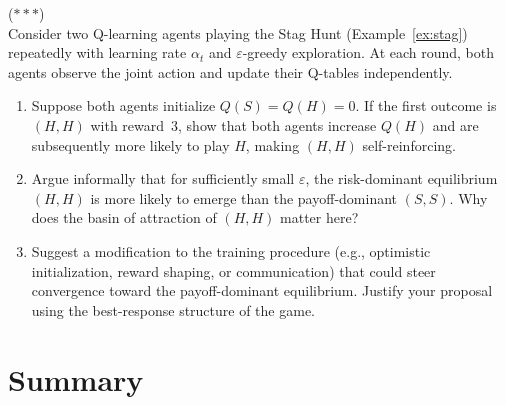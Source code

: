 \documentclass[11pt,a4paper]{article}
\begin{document}
\begin{exercise}
\label{ex:marl_selection}
\textnormal{(\(***\))} \\
Consider two Q-learning agents playing the Stag Hunt (Example~\ref{ex:stag})
repeatedly with learning rate $\alpha_t$ and $\varepsilon$-greedy
exploration.  At each round, both agents observe the joint action and update
their Q-tables independently.
\begin{enumerate}[label=(\alph*)]
    \item Suppose both agents initialize $Q(S) = Q(H) = 0$.  If the first
    outcome is $(H, H)$ with reward~3, show that both agents increase
    $Q(H)$ and are subsequently more likely to play $H$, making $(H, H)$
    self-reinforcing.
    \item Argue informally that for sufficiently small $\varepsilon$, the
    risk-dominant equilibrium $(H, H)$ is more likely to emerge than the
    payoff-dominant $(S, S)$.  Why does the basin of attraction of $(H, H)$
    matter here?
    \item Suggest a modification to the training procedure (e.g., optimistic
    initialization, reward shaping, or communication) that could steer
    convergence toward the payoff-dominant equilibrium.  Justify your
    proposal using the best-response structure of the game.
\end{enumerate}
\end{exercise}


\section{Summary}
\label{sec:summary}
\end{document}
